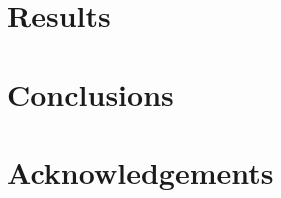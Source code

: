 \documentclass[fleqn,usenatbib]{mnras}
\begin{document}
\section{Results}

\section{Conclusions}

\section*{Acknowledgements}










\bsp	%
\label{lastpage}
\end{document}
